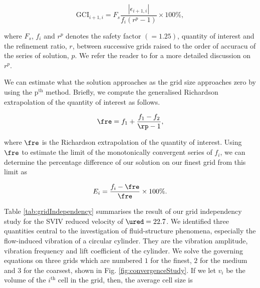 \documentclass[a4paper,fleqn]{cas-sc}
\begin{document}
\begin{equation}
  \text{GCI}_{i+1,i} = F_{s} \frac{\left |\epsilon_{i+1,i} \right |}{f_{i} \left ( r^{p} - 1 \right )} \times 100\%,
  \label{eq:gci}
\end{equation}

\noindent where $F_{s}$, $f_{i}$ and $r^{p}$ denotes the safety factor $\left ( = 1.25 \right )$, quantity of interest and the refinement ratio, $r$, between successive grids raised to the order of accuracu of the series of solution, $p$. We refer the reader to \citet{Stern2001,Langley2018} for a more detailed discussion on $r^{p}$.

We can estimate what the solution approaches as the grid size approaches zero by using the $\text{p}^{\text{th}}$ method. Briefly, we compute the generalised Richardson extrapolation of the quantity of interest as follows.

\begin{equation}
  \fre = f_{1} + \frac{f_{1} - f_{2}}{\rp - 1},
  \label{eq:richardsonExtrapolation}
\end{equation}

\noindent where $\fre$ is the Richardson extrapolation of the quantity of interest. Using $\fre$ to estimate the limit of the monotonically convergent series of $f_{i}$, we can determine the percentage difference of our solution on our finest grid from this limit as

\begin{equation}
  E_{i} = \frac{f_{i} - \fre}{\fre} \times 100\%.
  \label{eq:percentageDifference}
\end{equation}

Table \ref{tab:gridIndependency} summarises the result of our grid independency study for the SVIV reduced velocity of $\ured = 22.7$. We identified three quantities central to the investigation of fluid-structure phenomena, especially the flow-induced vibration of a circular cylinder. They are the vibration amplitude, vibration frequency and lift coefficient of the cylinder. We solve the governing equations on three grids which are numbered $1$ for the finest, $2$ for the medium and $3$ for the coarsest, shown in Fig. \ref{fig:convergenceStudy}. If we let $v_{i}$ be the volume of the $i^{\text{th}}$ cell in the grid, then, the average cell size is
\end{document}
